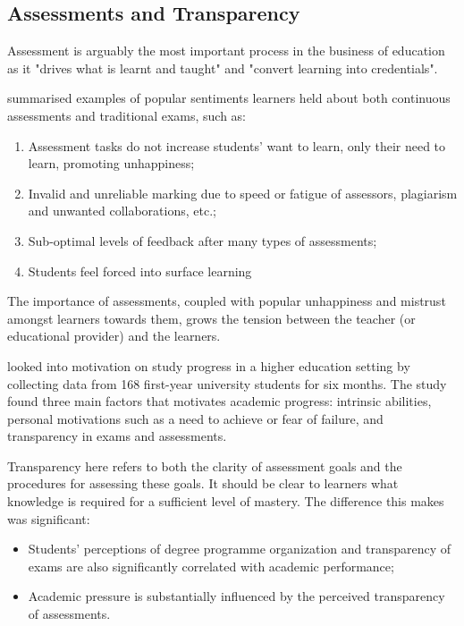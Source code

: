 \subsection{Assessments and Transparency}

Assessment is arguably the most important process in the business of education as it "drives what 
is learnt and taught" and "convert learning into credentials". \citep[p.160]{campbell2010digital}

\citet{brown1999assessment} summarised examples of popular sentiments learners held about both 
continuous assessments and traditional exams, such as:

\begin{enumerate}
    \item Assessment tasks do not increase students' want to learn, only their need to learn, promoting unhappiness;
    \item Invalid and unreliable marking due to speed or fatigue of assessors, plagiarism and unwanted collaborations, etc.;
    \item Sub-optimal levels of feedback after many types of assessments;
    \item Students feel forced into surface learning
    \citep[p.62-65]{brown1999assessment}
\end{enumerate}

The importance of assessments, coupled with popular unhappiness and mistrust amongst learners towards 
them, grows the tension between the teacher (or educational provider) and the learners.

\citet{suhre2013determinants} looked into motivation on study progress in a higher education setting by collecting data 
from 168 first-year university students for six months. The study found three main factors that motivates academic 
progress: intrinsic abilities, personal motivations such as a need to achieve or fear of failure, and transparency in 
exams and assessments.

Transparency here refers to both the clarity of assessment goals and the procedures for assessing these goals. 
It should be clear to learners what knowledge is required for a sufficient level of mastery. \citep{suhre2013determinants}
The difference this makes was significant:

\begin{itemize}
  \item Students' perceptions of degree programme organization and transparency of exams are also 
  significantly correlated with academic performance;
  \item Academic pressure is substantially influenced by the perceived transparency of assessments.
\end{itemize}


